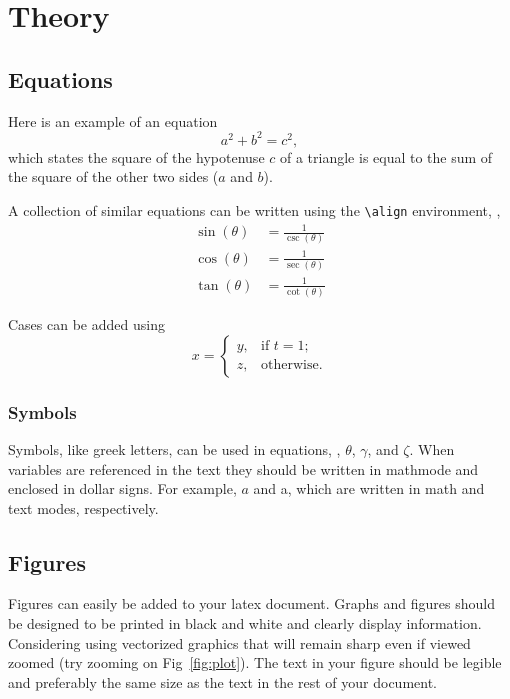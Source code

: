 \chapter{Theory} \label{CH:theory}

\section{Equations}\label{Sect:eqns}
Here is an example of an equation
\begin{equation}\label{eq:pyth}
  a^2+b^2=c^2,
\end{equation}
which states the square of the hypotenuse $c$ of a triangle is equal to the sum of the square of the other two sides ($a$ and $b$). 

A collection of similar equations can be written using the \verb|\align| environment, \eg, 
\begin{align}\label{eq:trig}
  \sin(\theta) &= \frac{1}{\csc(\theta)}\\
  \cos(\theta) &= \frac{1}{\sec(\theta)}\\
  \tan(\theta) &= \frac{1}{\cot(\theta)}
\end{align}

Cases can be added using
\begin{equation}
  x = \begin{cases}
    y, & \text{if $t = 1$;} \\
    z, & \text{otherwise.}
  \end{cases}
\end{equation}

\subsection{Symbols}\label{Sect:sym}
Symbols, like greek letters, can be used in equations, \eg, $\theta$, $\gamma$, and $\zeta$.  When variables are referenced in the text they should be written in mathmode and enclosed in dollar signs.  For example, $a$ and a, which are written in math and text modes, respectively.

\section{Figures}\label{Sect:figs}
Figures can easily be added to your latex document.  Graphs and figures should be designed to be printed in black and white and clearly display information.  Considering using vectorized graphics that will remain sharp even if viewed zoomed (try zooming on Fig~\ref{fig:plot}).  The text in your figure should be legible and preferably the same size as the text in the rest of your document.

